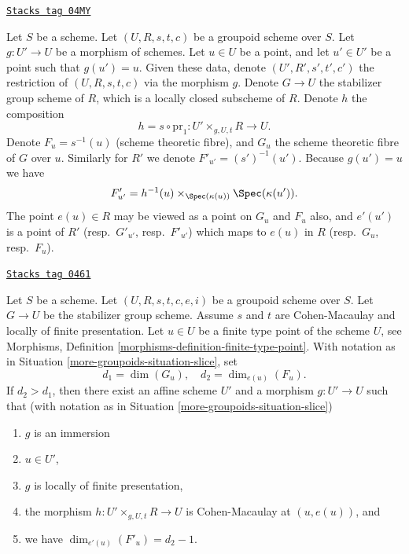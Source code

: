 \begin{definition}
\label{more-groupoids-situation-slice}
\href{https://stacks.math.columbia.edu/tag/04MY}{\texttt{Stacks tag 04MY}}

Let $S$ be a scheme.
Let $(U, R, s, t, c)$ be a groupoid scheme over $S$.
Let $g : U' \to U$ be a morphism of schemes.
Let $u \in U$ be a point, and let $u' \in U'$ be a point such that
$g(u') = u$. Given these data, denote $(U', R', s', t', c')$
the restriction of $(U, R, s, t, c)$ via the morphism $g$.
Denote $G \to U$ the stabilizer group scheme of $R$, which
is a locally closed subscheme of $R$.
Denote $h$ the composition
$$
h = s \circ \text{pr}_1 : U' \times_{g, U, t} R \longrightarrow U.
$$
Denote $F_u = s^{-1}(u)$ (scheme theoretic fibre), and $G_u$ the
scheme theoretic fibre of $G$ over $u$.
Similarly for $R'$ we denote $F'_{u'} = (s')^{-1}(u')$.
Because $g(u') = u$ we have
$$
F'_{u'} = h^{-1}(u) \times_{\Spec(\kappa(u))} \Spec(\kappa(u')).
$$
The point $e(u) \in R$ may be viewed as a point on $G_u$ and $F_u$ also, and
$e'(u')$ is a point of $R'$ (resp.\ $G'_{u'}$, resp.\ $F'_{u'}$) which maps
to $e(u)$ in $R$ (resp.\ $G_u$, resp.\ $F_u$).
\end{definition}

\begin{lemma}[Slice]
\label{more-groupoids-lemma-slice}
\href{https://stacks.math.columbia.edu/tag/0461}{\texttt{Stacks tag 0461}}

Let $S$ be a scheme.
Let $(U, R, s, t, c, e, i)$ be a groupoid scheme over $S$.
Let $G \to U$ be the stabilizer group scheme.
Assume $s$ and $t$ are Cohen-Macaulay and locally of finite presentation.
Let $u \in U$ be a finite type point of the scheme $U$, see
Morphisms, Definition \ref{morphisms-definition-finite-type-point}.
With notation as in
Situation \ref{more-groupoids-situation-slice},
set
$$
d_1 = \dim(G_u), \quad
d_2 = \dim_{e(u)}(F_u).
$$
If $d_2 > d_1$, then there exist an affine scheme $U'$
and a morphism $g : U' \to U$ such that (with notation as in
Situation \ref{more-groupoids-situation-slice})
\begin{enumerate}
\item $g$ is an immersion
\item $u \in U'$,
\item $g$ is locally of finite presentation,
\item the morphism $h : U' \times_{g, U, t} R \longrightarrow U$
is Cohen-Macaulay at $(u, e(u))$, and
\item we have $\dim_{e'(u)}(F'_u) = d_2 - 1$.
\end{enumerate}
\end{lemma}

